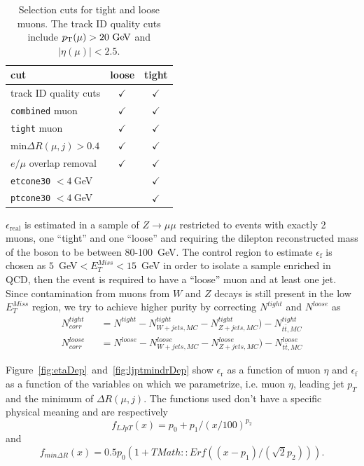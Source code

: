\begin{table}[htb]\centering
\begin{tabular}{lcc}
cut & loose & tight \\\midrule
track ID quality cuts & $\checkmark$ & $\checkmark$\\
\texttt{combined} muon & $\checkmark$ & $\checkmark$\\
\texttt{tight} muon & $\checkmark$ & $\checkmark$\\
min$\Delta R(\mu,j)>0.4$ & $\checkmark$ & $\checkmark$\\
$e/\mu$ overlap removal& $\checkmark$ & $\checkmark$\\
\texttt{etcone30} $<4~$GeV &  & $\checkmark$\\
\texttt{ptcone30} $<4~$GeV &  & $\checkmark$\\\bottomrule
\end{tabular}
\caption{Selection cuts for tight and loose muons. The track ID quality cuts include
 $\pt(\mu) > 20 \GeV$ and $|\eta(\mu)| < 2.5$.}\label{tab:tightloosemu}
\end{table}

$\epsilon_\mathrm{real}$ is estimated in a sample of $Z\rightarrow \mu\mu$ 
restricted to events with exactly 2 muons, one ``tight'' and one ``loose'' 
and requiring the dilepton reconstructed mass of the boson to be between 80-100~GeV. 
The control region to estimate $\epsilon_\mathrm{f}$ is chosen as 
$5$~GeV$< E^{Miss}_T<15$~GeV in order to isolate a sample enriched 
in QCD, then the event is required to have a ``loose'' muon and at 
least one jet. Since contamination from muons from $W$ and $Z$ decays 
is still present in the low $E^{Miss}_T$ region, we try to achieve 
higher purity by correcting $N^{tight}$ and $N^{loose}$ as 
\begin{eqnarray}
N^{tight}_{corr} &&=  N^{tight} - N^{tight}_{W+jets,MC} - N^{tight}_{Z+jets,MC}) - N^{tight}_{t\bar{t},MC}\\
N^{loose}_{corr} &&=  N^{loose} - N^{loose}_{W+jets,MC} - N^{loose}_{Z+jets,MC}) - N^{loose}_{t\bar{t},MC}
\end{eqnarray}

Figure~\ref{fig:etaDep}~and~\ref{fig:ljptmindrDep}  
show $\epsilon_\mathrm{r}$ as a function of muon $\eta$ 
and  $\epsilon_\mathrm{f}$ as a function of the variables 
on which we parametrize, i.e. muon $\eta$, leading jet $p_T$ 
and the minimum of $\Delta R(\mu,j)$.  The functions used don't 
have a specific physical meaning and are respectively 
\begin{equation}\label{eq:paruntagljpt}
f_{LJpT}(x) = p_0 + p_1/(x/100)^{p_2}
\end{equation} and 
\begin{equation}\label{eq:parmindr}
f_{min\Delta R}(x) = 0.5 p_0 (1+TMath::Erf( (x-p_1)/(\sqrt{2}p_2))).
\end{equation} 

